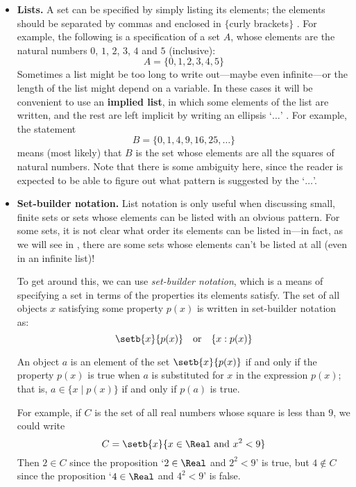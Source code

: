 \begin{itemize}
\item \textbf{Lists.}
A set can be specified by simply listing its elements; the elements should be separated by commas and enclosed in $\{$curly brackets$\}$ \lindexmmc{\{\dots\textbackslash{}\}}{$\{\dots\}$}. For example, the following is a specification of a set $A$, whose elements are the natural numbers $0$, $1$, $2$, $3$, $4$ and $5$ (inclusive):
\[ A = \{ 0, 1, 2, 3, 4, 5 \} \]
Sometimes a list might be too long to write out---maybe even infinite---or the length of the list might depend on a variable. In these cases it will be convenient to use an \textbf{implied list}, in which some elements of the list are written, and the rest are left implicit by writing an ellipsis `$\dots$' . For example, the statement
\[ B = \{ 0, 1, 4, 9, 16, 25, \dots \} \]
means (most likely) that $B$ is the set whose elements are all the squares of natural numbers. Note that there is some ambiguity here, since the reader is expected to be able to figure out what pattern is suggested by the `$\dots$'.

\item \textbf{Set-builder notation.}
List notation is only useful when discussing small, finite sets or sets whose elements can be listed with an obvious pattern. For some sets, it is not clear what order its elements can be listed in---in fact, as we will see in , there are some sets whose elements can't be listed at all (even in an infinite list)!

To get around this, we can use \textit{set-builder notation}, which is a means of specifying a set in terms of the properties its elements satisfy. The set of all objects $x$ satisfying some property $p(x)$ is written in set-builder notation as:
\[ \setb{x}{p(x)} \quad \text{or} \quad \{ x : p(x) \} \]

An object $a$ is an element of the set $\setb{x}{p(x)}$ if and only if the property $p(x)$ is true when $a$ is substituted for $x$ in the expression $p(x)$; that is, $a \in \{ x \mid p(x) \}$ if and only if $p(a)$ is true.

For example, if $C$ is the set of all real numbers whose square is less than $9$, we could write
\[ C = \setb{x}{x \in \Real \text{ and } x^2 < 9} \]
Then $2 \in C$ since the proposition `$2 \in \Real$ and $2^2 < 9$' is true, but $4 \not\in C$ since the proposition `$4 \in \Real$ and $4^2 < 9$' is false.


\end{itemize}
